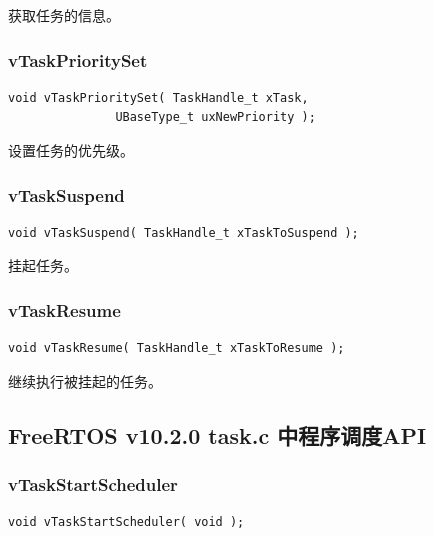 \documentclass[12pt, a4paper]{article}
\begin{document}
获取任务的信息。

\subsubsection {vTaskPrioritySet}

\begin{lstlisting}[language={[ANSI]C},keywordstyle=\color{blue!70},commentstyle=\color{red!50!green!50!blue!50},frame=shadowbox, rulesepcolor=\color{red!20!green!20!blue!20}]
void vTaskPrioritySet( TaskHandle_t xTask,
		       UBaseType_t uxNewPriority );
\end{lstlisting}

设置任务的优先级。

\subsubsection {vTaskSuspend}

\begin{lstlisting}[language={[ANSI]C},keywordstyle=\color{blue!70},commentstyle=\color{red!50!green!50!blue!50},frame=shadowbox, rulesepcolor=\color{red!20!green!20!blue!20}]
void vTaskSuspend( TaskHandle_t xTaskToSuspend );
\end{lstlisting}

挂起任务。

\subsubsection {vTaskResume}

\begin{lstlisting}[language={[ANSI]C},keywordstyle=\color{blue!70},commentstyle=\color{red!50!green!50!blue!50},frame=shadowbox, rulesepcolor=\color{red!20!green!20!blue!20}]
void vTaskResume( TaskHandle_t xTaskToResume );
\end{lstlisting}

继续执行被挂起的任务。

\subsection {FreeRTOS v10.2.0 task.c 中程序调度API}

\subsubsection {vTaskStartScheduler}

\begin{lstlisting}[language={[ANSI]C},keywordstyle=\color{blue!70},commentstyle=\color{red!50!green!50!blue!50},frame=shadowbox, rulesepcolor=\color{red!20!green!20!blue!20}]
void vTaskStartScheduler( void );
\end{lstlisting}
\end{document}
